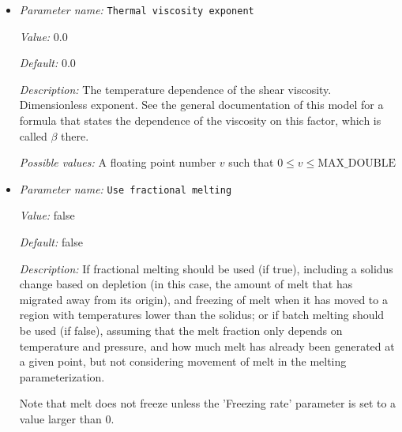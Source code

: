 \begin{itemize}
{\it Value:} 2e-5


{\it Default:} 2e-5


{\it Description:} The value of the thermal expansion coefficient $\beta$. Units: $1/K$.


{\it Possible values:} A floating point number $v$ such that $0 \leq v \leq \text{MAX\_DOUBLE}$
\item {\it Parameter name:} {\tt Thermal viscosity exponent}
\label{parameters:Material model/Melt simple/Thermal viscosity exponent}
\label{parameters:Material_20model/Melt_20simple/Thermal_20viscosity_20exponent}


{\it Value:} 0.0


{\it Default:} 0.0


{\it Description:} The temperature dependence of the shear viscosity. Dimensionless exponent. See the general documentation of this model for a formula that states the dependence of the viscosity on this factor, which is called $\beta$ there.


{\it Possible values:} A floating point number $v$ such that $0 \leq v \leq \text{MAX\_DOUBLE}$
\item {\it Parameter name:} {\tt Use fractional melting}
\label{parameters:Material model/Melt simple/Use fractional melting}
\label{parameters:Material_20model/Melt_20simple/Use_20fractional_20melting}


{\it Value:} false


{\it Default:} false


{\it Description:} If fractional melting should be used (if true), including a solidus change based on depletion (in this case, the amount of melt that has migrated away from its origin), and freezing of melt when it has moved to a region with temperatures lower than the solidus; or if batch melting should be used (if false), assuming that the melt fraction only depends on temperature and pressure, and how much melt has already been generated at a given point, but not considering movement of melt in the melting parameterization.

Note that melt does not freeze unless the 'Freezing rate' parameter is set to a value larger than 0.



\end{itemize}
